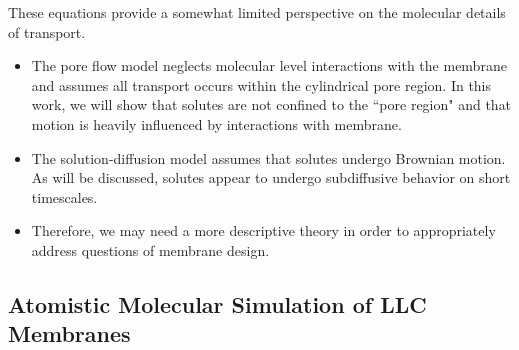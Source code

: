   These equations provide a somewhat limited perspective on the molecular details
  of transport.
  \begin{itemize}
    \item The pore flow model neglects molecular level interactions with the membrane
    and assumes all transport occurs within the cylindrical pore region. In this work, we
    will show that solutes are not confined to the ``pore region" and that motion is 
    heavily influenced by interactions with membrane.
    \item The solution-diffusion model assumes that solutes undergo Brownian motion. As will
    be discussed, solutes appear to undergo subdiffusive behavior on short
    timescales. 
    \item Therefore, we may need a more descriptive theory in order
    to appropriately address questions of membrane design.
  \end{itemize}
  

  \subsection{Atomistic Molecular Simulation of LLC Membranes}  
  
